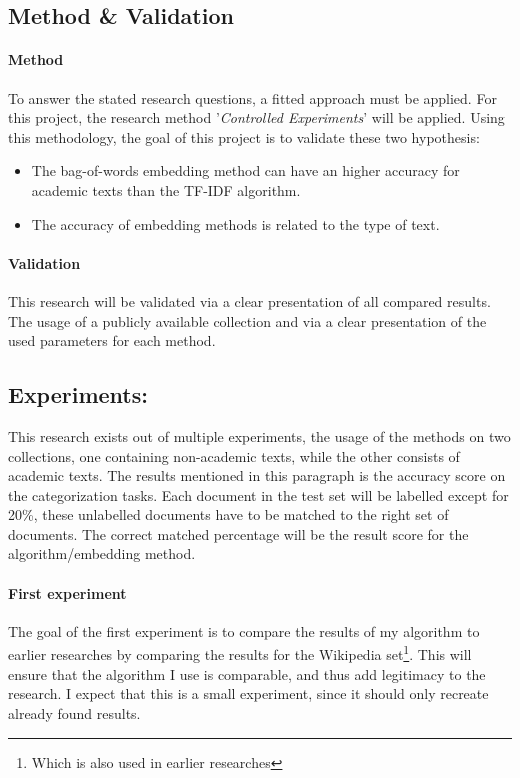 \documentclass[10pt,a4paper]{article}
\begin{document}
\subsection{Method \& Validation}
\paragraph{Method} To answer the stated research questions, a fitted approach must be applied. For this project, the research method '\textit{Controlled Experiments}' will be applied. Using this methodology, the goal of this project is to validate these two hypothesis:
\begin{itemize}
\item{The bag-of-words embedding method can have an higher accuracy for academic texts than the TF-IDF algorithm.}
\item{The accuracy of embedding methods is related to the type of text.}
\end{itemize}
\paragraph{Validation} This research will be validated via a clear presentation of all compared results. The usage of a publicly available collection and via a clear presentation of the used parameters for each method.

\subsection{Experiments:}
This research exists out of multiple experiments, the usage of the methods on two collections, one containing non-academic texts, while the other consists of academic texts. The results mentioned in this paragraph is the accuracy score on the categorization tasks. Each document in the test set will be labelled except for 20\%, these unlabelled documents have to be matched to the right set of documents. The correct matched percentage will be the result score for the algorithm/embedding method.\\
\paragraph{First experiment}The goal of the first experiment is to compare the results of my algorithm to earlier researches by comparing the results for the Wikipedia set\footnote{Which is also used in earlier researches}. This will ensure that the algorithm I use is comparable, and thus add legitimacy to the research. I expect that this is a small experiment, since it should only recreate already found results.\\
\end{document}
